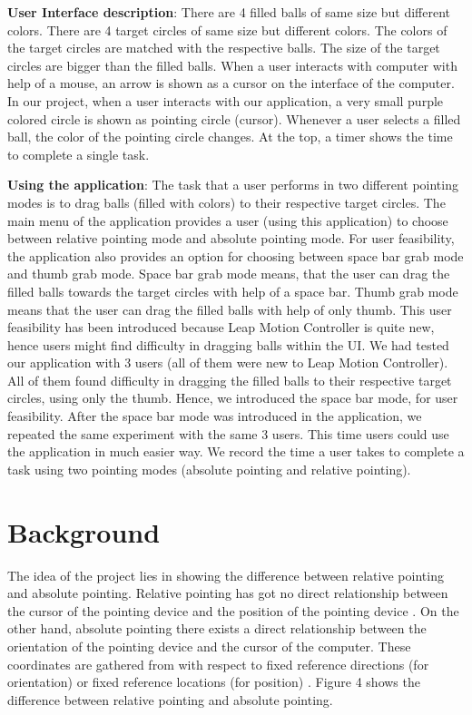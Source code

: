 \documentclass[titlepage]{article}
\begin{document}
{\bf User Interface description}: There are 4 filled balls of same size but different colors. There are 4 target circles of same size but different colors. The colors of the target circles are matched with the respective balls. The size of the target circles are bigger than the filled balls. When a user interacts with computer with help of a mouse, an arrow is shown as a cursor on the interface of the computer. In our project, when a user interacts with our application, a very small purple colored circle is shown as pointing circle (cursor). Whenever a user selects a filled ball, the color of the pointing circle changes. At the top, a timer shows the time to complete a single task.

{\bf Using the application}: The task that a user performs in two different pointing modes is to drag balls (filled with colors) to their respective target circles. The main menu of the application  provides a user (using this application) to choose between relative pointing mode and absolute pointing mode. For user feasibility, the application also provides an option for choosing between space bar grab mode and thumb grab mode. Space bar grab mode means, that the user can drag the filled balls towards the target circles with help of a space bar. Thumb grab mode means that the user can drag the filled balls with help of only thumb. This user feasibility has been introduced because Leap Motion Controller is quite new, hence users might find difficulty in dragging balls within the UI. We had tested our application with 3 users (all of them were new to Leap Motion Controller). All of them found difficulty in dragging the filled balls to their respective target circles, using only the thumb. Hence, we introduced the space bar mode, for user feasibility. After the space bar mode was introduced in the application, we repeated the same experiment with the same 3 users. This time users could use the application in much easier way. We record the time a user takes to complete a task using two pointing modes (absolute pointing and relative pointing).


\section{Background}
The idea of the project lies in showing the difference between relative pointing and absolute pointing. Relative pointing has got no direct relationship between the cursor of the pointing device and the position of the pointing device \cite{2}. On the other hand, absolute pointing there exists a direct relationship between the orientation of the pointing device and the cursor of the computer. These coordinates are gathered from with respect to fixed reference directions (for orientation) or fixed reference locations (for position) \cite{2}. Figure 4 shows the difference between relative pointing and absolute pointing. 
\end{document}
